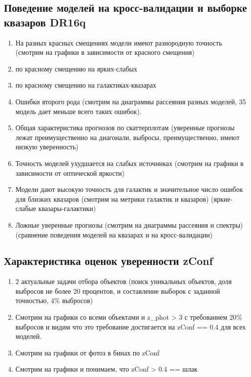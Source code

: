 \documentclass[fleqn,usenatbib]{mnras}
\begin{document}
\subsection{Поведение моделей на кросс-валидации и выборке квазаров DR16q}
\begin{enumerate}
	\item На разных красных смещениях модели имеют разнородную точность (смотрим на графики в зависимости от красного смещения)
	\item по красному смещению на ярких-слабых
	\item по красному смещению на галактиках-квазарах
	\item Ошибки второго рода (смотрим на диаграммы рассеяния разных моделей, 35 модель дает меньше всего таких ошибок).
	\item Общая характеристика прогнозов по скаттерплотам (уверенные прогнозы лежат преимущественно на диагонали, выбросы, преимущественно, имеют низкую уверенность)
	\item Точность моделей ухудшается на слабых источниках (смотрим на графики в зависимости от оптической яркости)
	\item Модели дают высокую точность для галактик и значительное число ошибок для близких квазаров (смотрим на метрики галактик и квазаров) (яркие-слабые квазары-галактики)
	\item Ложные уверенные прогнозы (смотрим на диаграммы рассеяния и спектры) (сравнение поведения моделей на квазарах и на кросс-валидации)
\end{enumerate}

\subsection{Характеристика оценок уверенности zConf}
\begin{enumerate}
	\item 2 актуальные задачи отбора объектов (поиск уникальных объектов, доля выбросов не более 20 процентов, и составление выборок с заданной точностью, 4\% выбросов)
	\item Смотрим на графики со всеми объектами и z\_phot > 3 с требованием 20\% выбросов и видим что это требование достигается на zConf == 0.4 для всех моделей.
	\item Смотрим на графики от фотоз в бинах по zConf 
	\item Смотрим на графики и понимаем, что zConf > 0.4 == шлак
\end{enumerate}
\end{document}
